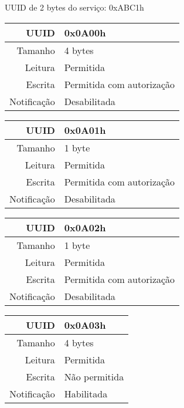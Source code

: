 \begin{tcolorbox}[arc=3mm,fontupper=\small,fonttitle=\bfseries,
subtitle style={boxrule=0.4pt, colback=white},colframe=green!25!black,
halign=center,bottom=0mm,
title=Air Pressure Sensor Service]
	UUID de 2 bytes do serviço: 0xABC1h
	
	\begin{tcbitemize}[raster columns=2,raster equal height,fontupper=\footnotesize,
	colbacktitle=yellow!100!red!100!black, coltitle=black,
	fonttitle=\footnotesize\bfseries,size=small, halign=center]
	
	\tcbitem [squeezed title={Sensing Interval Characteristic}]
		\begin{tabular}{ r | l }
		UUID & 0x0A00h \\ \hline
		Tamanho & 4 bytes \\ \hline
		Leitura & Permitida \\ \hline
		Escrita & Permitida com autorização \\ \hline
		Notificação & Desabilitada 
		\end{tabular}

		\tcbitem [squeezed title={Sensor Status Characteristic}]
		\begin{tabular}{ r | l }
		UUID & 0x0A01h \\ \hline
		Tamanho & 1 byte \\ \hline
		Leitura & Permitida \\ \hline
		Escrita & Permitida com autorização \\ \hline
		Notificação & Desabilitada 
		\end{tabular}
		
		\tcbitem [squeezed title={Sensor Resolution Characteristic}]
		\begin{tabular}{ r | l }
		UUID & 0x0A02h \\ \hline
		Tamanho & 1 byte \\ \hline
		Leitura & Permitida \\ \hline
		Escrita & Permitida com autorização \\ \hline
		Notificação & Desabilitada 
		\end{tabular}

		\tcbitem [squeezed title={Pressure Data Characteristic}]
		\begin{tabular}{ r | l }
		UUID & 0x0A03h \\ \hline
		Tamanho & 4 bytes \\ \hline
		Leitura & Permitida \\ \hline
		Escrita & Não permitida \\ \hline
		Notificação & Habilitada 
		\end{tabular}
		

\end{tcbitemize}
\end{tcolorbox}
